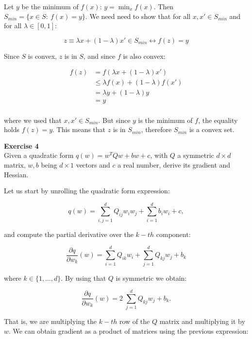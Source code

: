\documentclass[11pt,table]{article}
\newenvironment{problem}[2][Exercise]
    { \begin{mdframed}[backgroundcolor=gray!20] \textbf{#1 #2} \\}
    {  \end{mdframed}}
\begin{document}
Let \(y\) be the minimum of \(f(x)\): \(y = \min_x f(x)\). Then \( S_{min} = \{x \in S : \ f(x) = y \} \). We need need to show that for all \(x, x' \in S_{min}\) and for all \(\lambda \in [0,1]\):

\[
	z \equiv \lambda x + (1-\lambda) x' \in S_{min} \leftrightarrow f(z) = y
\]

Since \(S\) is convex, \(z\) is in \(S\), and since \(f\) is also convex:

\begin{align*}
	f(z) & = f\left(\lambda x + (1-\lambda) x'\right) \\
	& \leq \lambda f(x) + (1-\lambda) f(x') \\
	& = \lambda y + (1-\lambda) y \\
	& = y \\
\end{align*}

where we used that \(x, x'\in S_{min}\). But since \(y\) is the minimum of \(f\), the equality holds \(f(z) = y\). This means that \(z\) is in \(S_{min}\), therefore \(S_{min}\) is a convex set.

\begin{problem}{4}
  Given a quadratic form \( q(w) = w^TQw + bw + c \), with \( Q \) a symmetric \( d\times d \) matrix, \( w,b\) being \(d\times 1 \) vectors and \( c \) a real number, derive its gradient and Hessian.
\end{problem}

Let us start by unrolling the quadratic form expression:

\[
	q(w) = \sum_{i,j=1}^{d} Q_{ij} w_{i}w_{j} + \sum_{i=1}^{d}b_{i}w_{i} + c,
\]

and compute the partial derivative over the \(k-th\) component:

\[
	\frac{\partial q}{\partial w_k} (w) = \sum_{i=1}^{d} Q_{ik} w_{i} + \sum_{j=1}^{d} Q_{kj} w_{j} + b_{k}
\]

where \(k \in \{1, \ldots, d\}\). By using that \(Q\) is symmetric we obtain:

\begin{equation}
	\label{eq-4}
	\frac{\partial q}{\partial w_k} (w) = 2 \; \sum_{j=1}^{d} Q_{kj} w_{j} + b_{k}.
\end{equation}

That is, we are multiplying the \(k-th\) row of the \(Q\) matrix and multiplying it by \(w\). We can obtain gradient as a product of matrices using the previous expression:
\end{document}
